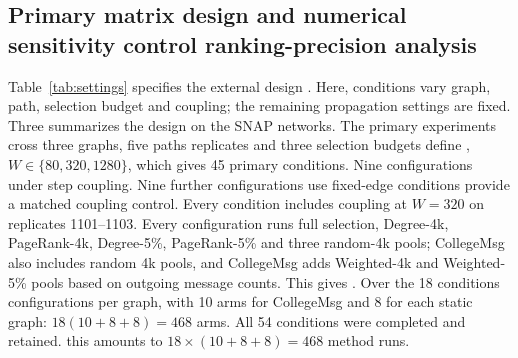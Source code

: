\documentclass[smallextended]{svjour3}
\providecommand{\DIFaddtex}[1]{{\protect\color{blue} \sf #1}} %
\providecommand{\DIFdeltex}[1]{{\protect\color{red} \scriptsize #1}} %
\providecommand{\DIFaddbegin}{} %
\providecommand{\DIFaddend}{} %
\providecommand{\DIFdelbegin}{} %
\providecommand{\DIFdelend}{} %
\providecommand{\DIFadd}[1]{\texorpdfstring{\DIFaddtex{#1}}{#1}} %
\providecommand{\DIFdel}[1]{\texorpdfstring{\DIFdeltex{#1}}{}} %
\providecommand{\DIFscaledelfig}{0.5}
\newlength{\DIFdelgraphicswidth} %
\newlength{\DIFdelgraphicsheight} %
\providecommand{\DIFaddincludegraphics}[2][]{{\color{blue}\fbox{\DIFOincludegraphics[#1]{#2}}}} %
\providecommand{\DIFdelincludegraphics}[2][]{%
\sbox{\DIFdelgraphicsbox}{\DIFOincludegraphics[#1]{#2}}%
\settoboxwidth{\DIFdelgraphicswidth}{\DIFdelgraphicsbox} %
\settoboxtotalheight{\DIFdelgraphicsheight}{\DIFdelgraphicsbox} %
\scalebox{\DIFscaledelfig}{%
\parbox[b]{\DIFdelgraphicswidth}{\usebox{\DIFdelgraphicsbox}\\[-\baselineskip] \rule{\DIFdelgraphicswidth}{0em}}\llap{\resizebox{\DIFdelgraphicswidth}{\DIFdelgraphicsheight}{%
\setlength{\unitlength}{\DIFdelgraphicswidth}%
\begin{picture}(1,1)%
\thicklines\linethickness{2pt} %
{\color[rgb]{1,0,0}\put(0,0){\framebox(1,1){}}}%
{\color[rgb]{1,0,0}\put(0,0){\line( 1,1){1}}}%
{\color[rgb]{1,0,0}\put(0,1){\line(1,-1){1}}}%
\end{picture}%
}\hspace*{3pt}}} %
} %
\DeclareRobustCommand{\DIFaddbegin}{\DIFOaddbegin \let\includegraphics\DIFaddincludegraphics} %
\DeclareRobustCommand{\DIFaddend}{\DIFOaddend \let\includegraphics\DIFOincludegraphics} %
\DeclareRobustCommand{\DIFdelbegin}{\DIFOdelbegin \let\includegraphics\DIFdelincludegraphics} %
\DeclareRobustCommand{\DIFdelend}{\DIFOaddend \let\includegraphics\DIFOincludegraphics} %
\begin{document}
\subsection{Primary \DIFdelbegin \DIFdel{matrix }\DIFdelend \DIFaddbegin \DIFadd{design }\DIFaddend and \DIFdelbegin \DIFdel{numerical sensitivity control}\DIFdelend \DIFaddbegin \DIFadd{ranking-precision analysis}\DIFaddend }
Table~\ref{tab:settings} \DIFdelbegin \DIFdel{specifies the external design . Here, conditions vary graph, path, selection budget and coupling; the remaining propagation settings are fixed. Three }\DIFdelend \DIFaddbegin \DIFadd{summarizes the design on the SNAP networks. The primary experiments cross three }\DIFaddend graphs, five \DIFdelbegin \DIFdel{paths }\DIFdelend \DIFaddbegin \DIFadd{replicates }\DIFaddend and three selection budgets\DIFdelbegin \DIFdel{define }\DIFdelend \DIFaddbegin \DIFadd{, $W\in\{80,320,1280\}$, which gives }\DIFaddend 45 \DIFdelbegin \DIFdel{primary conditions. Nine }\DIFdelend \DIFaddbegin \DIFadd{configurations under step coupling. Nine further configurations use }\DIFaddend fixed-edge \DIFdelbegin \DIFdel{conditions provide a matched coupling control. Every condition includes }\DIFdelend \DIFaddbegin \DIFadd{coupling at $W=320$ on replicates 1101--1103. Every configuration runs }\DIFaddend full selection, Degree-4k, PageRank-4k, Degree-5\%, PageRank-5\% and three \DIFdelbegin \DIFdel{random-4k pools; CollegeMsg also includes }\DIFdelend \DIFaddbegin \DIFadd{random 4k pools, and CollegeMsg adds }\DIFaddend Weighted-4k and Weighted-5\%\DIFdelbegin \DIFdel{pools based on outgoing message counts. This gives }\DIFdelend \DIFaddbegin \DIFadd{. Over the }\DIFaddend 18 \DIFdelbegin \DIFdel{conditions }\DIFdelend \DIFaddbegin \DIFadd{configurations }\DIFaddend per graph, \DIFdelbegin \DIFdel{with 10 arms for CollegeMsg and 8 for each static graph: $18(10+8+8)=468$ arms.
All 54 conditions were completed and retained.
}\DIFdelend \DIFaddbegin \DIFadd{this amounts to $18\times(10+8+8)=468$ method runs.
}\DIFaddend 
\end{document}
